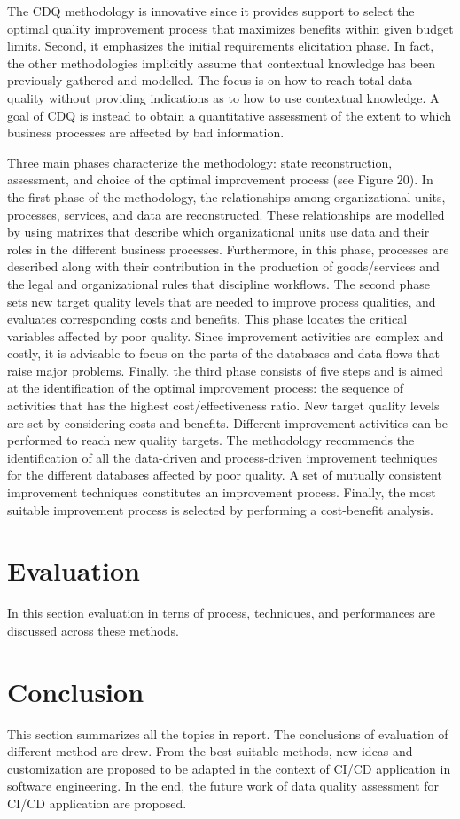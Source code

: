 \documentclass[pdftex,english,oribibl]{llncs}
\begin{document}
    The CDQ methodology is innovative since it provides support to select the optimal quality improvement process that maximizes benefits within given budget limits.
    Second, it emphasizes the initial requirements elicitation phase. In fact, the other methodologies implicitly assume that contextual knowledge has been previously gathered and modelled.
    The focus is on how to reach total data quality without providing indications as to how to use contextual knowledge.
    A goal of CDQ is instead to obtain a quantitative assessment of the extent to which business processes are affected by bad information.

    Three main phases characterize the methodology: state reconstruction, assessment, and choice of the optimal improvement process (see Figure 20).
    In the first phase of the methodology, the relationships among organizational units, processes, services, and data are reconstructed.
    These relationships are modelled by using matrixes that describe which organizational units use data and their roles in the different business processes.
    Furthermore, in this phase, processes are described along with their contribution in the production of goods/services and the legal and organizational rules that discipline workflows.
    The second phase sets new target quality levels that are needed to improve process qualities, and evaluates corresponding costs and benefits.
    This phase locates the critical variables affected by poor quality. Since improvement activities are complex and costly, it is advisable to focus on the parts of the databases and data flows that raise major problems.
    Finally, the third phase consists of five steps and is aimed at the identification of the optimal improvement process: the sequence of activities that has the highest cost/effectiveness ratio.
    New target quality levels are set by considering costs and benefits. Different improvement activities can be performed to reach new quality targets.
    The methodology recommends the identification of all the data-driven and process-driven improvement techniques for the different databases affected by poor quality.
    A set of mutually consistent improvement techniques constitutes an improvement process.
    Finally, the most suitable improvement process is selected by performing a cost-benefit analysis.

    \section{Evaluation}
    In this section evaluation in terns of process, techniques, and performances are discussed across these methods.
    \section{Conclusion}
    This section summarizes all the topics in report.
    The conclusions of evaluation of different method are drew.
    From the best suitable methods, new ideas and customization are proposed to be adapted in the context of CI/CD application in software engineering.
    In the end, the future work of data quality assessment for CI/CD application are proposed.
    
\end{document}
